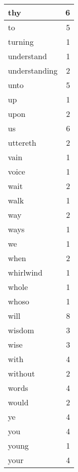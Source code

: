 \begin{center}
\begin{longtable}{l|r}
thy & 6\\ \hline 
to & 5\\ \hline 
turning & 1\\ \hline 
understand & 1\\ \hline 
understanding & 2\\ \hline 
unto & 5\\ \hline 
up & 1\\ \hline 
upon & 2\\ \hline 
us & 6\\ \hline 
uttereth & 2\\ \hline 
vain & 1\\ \hline 
voice & 1\\ \hline 
wait & 2\\ \hline 
walk & 1\\ \hline 
way & 2\\ \hline 
ways & 1\\ \hline 
we & 1\\ \hline 
when & 2\\ \hline 
whirlwind & 1\\ \hline 
whole & 1\\ \hline 
whoso & 1\\ \hline 
will & 8\\ \hline 
wisdom & 3\\ \hline 
wise & 3\\ \hline 
with & 4\\ \hline 
without & 2\\ \hline 
words & 4\\ \hline 
would & 2\\ \hline 
ye & 4\\ \hline 
you & 4\\ \hline 
young & 1\\ \hline 
your & 4\\ \hline 
\end{longtable}  
\end{center}  


  
\normalsize  

  
  
